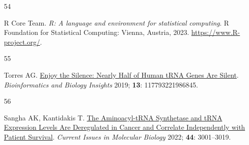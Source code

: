\documentclass[
  11pt,
]{article}
\newlength{\cslhangindent}
\newlength{\csllabelwidth}
\newlength{\cslentryspacingunit} %
\newenvironment{CSLReferences}[2] %
 {%
  \setlength{\parindent}{0pt}
  \ifodd #1
  \let\oldpar\par
  \def\par{\hangindent=\cslhangindent\oldpar}
  \fi
  \setlength{\parskip}{#2\cslentryspacingunit}
 }%
 {}
\newcommand{\CSLLeftMargin}[1]{\parbox[t]{\csllabelwidth}{#1}}
\newcommand{\CSLRightInline}[1]{\parbox[t]{\linewidth - \csllabelwidth}{#1}\break}
\begin{document}
\begin{CSLReferences}{0}{0}
\leavevmode{}%
\CSLLeftMargin{54 }%
\CSLRightInline{R Core Team. \emph{R: A language and environment for statistical computing}. R Foundation for Statistical Computing: Vienna, Austria, 2023. \url{https://www.R-project.org/}.}

\leavevmode{}%
\CSLLeftMargin{55 }%
\CSLRightInline{Torres AG. \href{https://doi.org/10.1177/1177932219868454}{Enjoy the Silence: Nearly Half of Human tRNA Genes Are Silent}. \emph{Bioinformatics and Biology Insights} 2019; \textbf{13}: 117793221986845.}

\leavevmode{}%
\CSLLeftMargin{56 }%
\CSLRightInline{Sangha AK, Kantidakis T. \href{https://doi.org/10.3390/cimb44070207}{The Aminoacyl-tRNA Synthetase and tRNA Expression Levels Are Deregulated in Cancer and Correlate Independently with Patient Survival}. \emph{Current Issues in Molecular Biology} 2022; \textbf{44}: 3001--3019.}

\end{CSLReferences}
\end{document}

